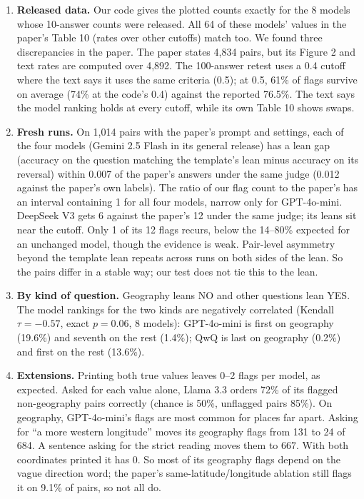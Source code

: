 \documentclass[10pt]{article}
\begin{document}
\begin{enumerate}
\item \textbf{Released data.} Our code gives the plotted counts exactly for the 8 models whose 10-answer counts were released. All 64 of these models' values in the paper's Table 10 (rates over other cutoffs) match too. We found three discrepancies in the paper. The paper states 4,834 pairs, but its Figure 2 and text rates are computed over 4,892. The 100-answer retest uses a 0.4 cutoff where the text says it uses the same criteria (0.5); at 0.5, 61\% of flags survive on average (74\% at the code's 0.4) against the reported 76.5\%. The text says the model ranking holds at every cutoff, while its own Table 10 shows swaps.
\item \textbf{Fresh runs.} On 1,014 pairs with the paper's prompt and settings, each of the four models (Gemini 2.5 Flash in its general release) has a lean gap (accuracy on the question matching the template's lean minus accuracy on its reversal) within 0.007 of the paper's answers under the same judge (0.012 against the paper's own labels). The ratio of our flag count to the paper's has an interval containing 1 for all four models, narrow only for GPT-4o-mini. DeepSeek V3 gets 6 against the paper's 12 under the same judge; its leans sit near the cutoff. Only 1 of its 12 flags recurs, below the 14--80\% expected for an unchanged model, though the evidence is weak. Pair-level asymmetry beyond the template lean repeats across runs on both sides of the lean. So the pairs differ in a stable way; our test does not tie this to the lean.
\item \textbf{By kind of question.} Geography leans NO and other questions lean YES. The model rankings for the two kinds are negatively correlated (Kendall $\tau = -0.57$, exact $p = 0.06$, 8 models): GPT-4o-mini is first on geography (19.6\%) and seventh on the rest (1.4\%); QwQ is last on geography (0.2\%) and first on the rest (13.6\%).
\item \textbf{Extensions.} Printing both true values leaves 0--2 flags per model, as expected. Asked for each value alone, Llama 3.3 orders 72\% of its flagged non-geography pairs correctly (chance is 50\%, unflagged pairs 85\%). On geography, GPT-4o-mini's flags are most common for places far apart. Asking for ``a more western longitude'' moves its geography flags from 131 to 24 of 684. A sentence asking for the strict reading moves them to 667. With both coordinates printed it has 0. So most of its geography flags depend on the vague direction word; the paper's same-latitude/longitude ablation still flags it on 9.1\% of pairs, so not all do.
\end{enumerate}
\end{document}
